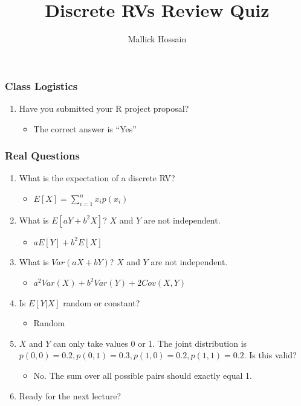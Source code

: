 \documentclass{beamer}
\title{Discrete RVs Review Quiz}
\author{Mallick Hossain}
\date{}
\institute{University of Pennsylvania}
\begin{document}
\begin{frame}
	\titlepage 
\end{frame} 

\begin{frame}
\frametitle{Class Logistics}
    \begin{enumerate}[<+- | alert@+>]
        \item Have you submitted your R project proposal?
            \begin{itemize}
                \item The correct answer is ``Yes''
            \end{itemize}
    \end{enumerate}
\end{frame} 

\begin{frame}
\frametitle{Real Questions}
    \begin{enumerate}[<+- | alert@+>]
		\item What is the expectation of a discrete RV?
			\begin{itemize}
				\item $E[X] = \sum_{i = 1}^n x_i p(x_i)$
			\end{itemize}			        
        \item What is $E[aY + b^2 X]$? $X$ and $Y$ are not independent.
            \begin{itemize}
                \item $aE[Y] + b^2 E[X]$
            \end{itemize}
        \item What is $Var(aX + bY)$? $X$ and $Y$ are not independent.
        	\begin{itemize}
        		\item $a^2 Var(X) + b^2 Var(Y) + 2 Cov(X, Y)$
        	\end{itemize}
        \item Is $E[Y|X]$ random or constant?
        	\begin{itemize}
        		\item Random
        	\end{itemize}
        \item $X$ and $Y$ can only take values 0 or 1. The joint distribution is $p(0, 0) = 0.2, p(0, 1) = 0.3, p(1, 0) = 0.2, p(1, 1) = 0.2$. Is this valid?
        \begin{itemize}
        	\item No. The sum over all possible pairs should exactly equal 1.
        \end{itemize}
     \item Ready for the next lecture?	
    \end{enumerate}
\end{frame} 
\end{document}
